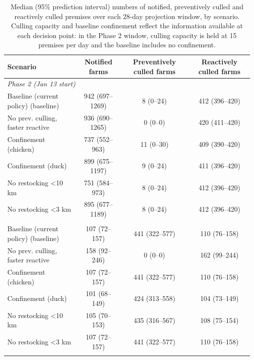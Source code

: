 \begin{table}[t]
\centering
\caption{Median (95\% prediction interval) numbers of notified, preventively
culled and reactively culled premises over each 28-day projection window, by
scenario. Culling capacity and baseline confinement reflect the information available at each decision point: in the Phase 2 window, culling capacity is held at 15 premises per day and the baseline includes no confinement.}
\label{tab:scenario_summary}
\begin{tabular}{lccc}
\toprule
Scenario & Notified farms & Preventively culled farms & Reactively culled farms \\
\midrule
\multicolumn{4}{l}{\textit{Phase 2 (Jan 13 start)}} \\
\quad Baseline (current policy) (baseline) & 942 (697--1269) & 8 (0--24) & 412 (396--420) \\
\quad No prev. culling, faster reactive & 936 (690--1265) & 0 (0--0) & 420 (411--420) \\
\quad Confinement (chicken) & 737 (552--963) & 11 (0--30) & 409 (390--420) \\
\quad Confinement (duck) & 899 (675--1197) & 9 (0--24) & 411 (396--420) \\
\quad No restocking <10 km & 751 (584--973) & 8 (0--24) & 412 (396--420) \\
\quad No restocking <3 km & 895 (677--1189) & 8 (0--24) & 412 (396--420) \\
\addlinespace
\multicolumn{4}{l}{\textit{Phase 3 (Feb 14 start)}} \\
\quad Baseline (current policy) (baseline) & 107 (72--157) & 441 (322--577) & 110 (76--158) \\
\quad No prev. culling, faster reactive & 158 (92--246) & 0 (0--0) & 162 (99--244) \\
\quad Confinement (chicken) & 107 (72--157) & 441 (322--577) & 110 (76--158) \\
\quad Confinement (duck) & 101 (68--149) & 424 (313--558) & 104 (73--149) \\
\quad No restocking <10 km & 105 (70--153) & 435 (316--567) & 108 (75--154) \\
\quad No restocking <3 km & 107 (72--157) & 441 (322--577) & 110 (76--158) \\
\addlinespace
\bottomrule
\end{tabular}
\end{table}

